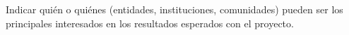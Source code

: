 \documentclass[../Main.tex]{subfiles}
\begin{document}
Indicar quién o quiénes (entidades, instituciones, comunidades) pueden ser los principales interesados en los resultados esperados con el proyecto.
\end{document}
